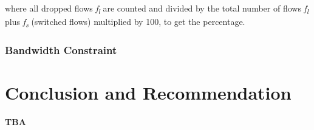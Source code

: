 \documentclass[journal]{IEEE/IEEEtran}
\begin{document}
where all dropped flows \textit{f\textsubscript{l}} are counted and divided by the total number of flows \textit{f\textsubscript{l}} plus \textit{f\textsubscript{s}} (switched flows) multiplied by 100, to get the percentage. 

\subsubsection{Bandwidth Constraint}



\section{Conclusion and Recommendation}
\textbf{TBA}

\end{document}
